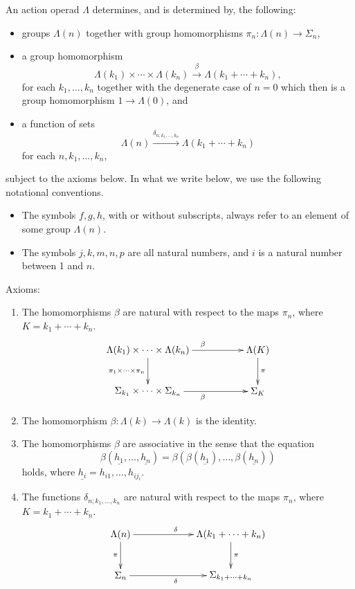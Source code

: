 \begin{thm}\label{thm:charAOp}
An action operad $\Lambda$ determines, and is determined by, the following: 
\begin{itemize}
\item groups $\Lambda(n)$ together with group homomorphisms $\pi_{n} \colon \Lambda(n) \rightarrow \Sigma_{n}$,
\item a group homomorphism
  \[
    \Lambda(k_{1}) \times \cdots \times \Lambda(k_{n}) \stackrel{\beta}{\longrightarrow} \Lambda(k_{1} + \cdots + k_{n}),
  \]
for each $k_{1}, \ldots, k_{n}$ together with the degenerate case of $n=0$ which then is a group homomorphism $1 \rightarrow \Lambda(0)$, and
\item a function of sets
  \[
    \Lambda(n) \stackrel{\delta_{n; k_{1}, \ldots, k_{n}}}{\longrightarrow} \Lambda(k_{1} + \cdots + k_{n})
  \]
for each $n, k_{1}, \ldots, k_{n}$,
\end{itemize}
subject to the axioms below. In what we write below, we use the following notational conventions.
\begin{itemize}
\item The symbols $f,g,h$, with or without subscripts, always refer to an element of some group $\Lambda(n)$.
\item The symbols $j,k,m,n,p$ are all natural numbers, and $i$ is a natural number between 1 and $n$.
\end{itemize}
Axioms:
\begin{enumerate}
\item\label{eq1} The homomorphisms $\beta$ are natural with respect to the maps $\pi_{n}$, where $K = k_{1} + \cdots + k_{n}$.
  \[
    \xy
      (0,0)*+{\Lambda(k_{1}) \times \cdots \times \Lambda(k_{n}) } ="00";
      (0,-15)*+{\Sigma_{k_{1}} \times \cdots \times \Sigma_{k_{n}}  } ="01";
      (40,0)*+{\Lambda(K) } ="20";
      (40,-15)*+{\Sigma_{K} } ="21";
      {\ar^{\beta} "00" ; "20"};
      {\ar^{\pi} "20" ; "21"};
      {\ar_{\pi_1 \times \cdots \times \pi_n} "00" ; "01"};
      {\ar_{\beta} "01" ; "21"};
    \endxy
  \]

\item\label{eq2} The homomorphism $\beta \colon \Lambda(k) \rightarrow \Lambda(k)$ is the identity.
\item\label{eq3} The homomorphisms $\beta$ are associative in the sense that the equation
\[
  \beta(\underline{h_1},\ldots,\underline{h_n}) = \beta(\beta(\underline{h_1}),\ldots,\beta(\underline{h_n}))
\]
holds, where $\underline{h_i} = h_{i1},\ldots,h_{ij_i}$.
\item\label{eq4} The functions $\delta_{n; k_{1}, \ldots, k_{n}}$ are natural with respect to the maps $\pi_{n}$, where $K = k_1 + \cdots + k_n$.
  \[
    \xy
      (0,0)*+{\Lambda(n)} ="00";
      (40,0)*+{\Lambda(k_{1} + \cdots + k_{n}) } ="20";
      (0,-15)*+{\Sigma_{n}  } ="01";
      (40,-15)*+{\Sigma_{k_{1} + \cdots + k_{n}} } ="21";
      {\ar^{\delta} "00" ; "20"};
      {\ar^{\pi} "20" ; "21"};
      {\ar_{\pi} "00" ; "01"};
      {\ar_{\delta} "01" ; "21"};
    \endxy
  \]


\end{enumerate}
\end{thm}
